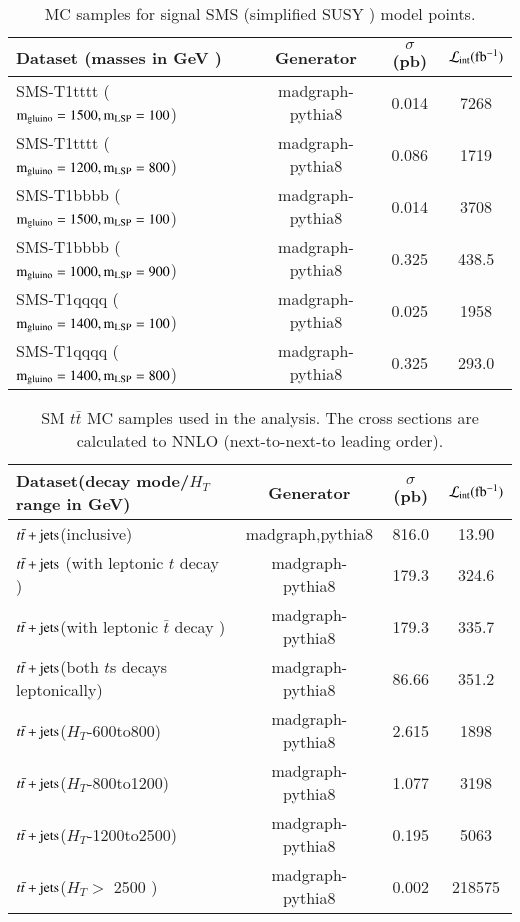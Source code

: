 \begin{table}[h]
\centering
\caption{MC  samples for signal SMS (simplified SUSY ) model points.}
\label{tab:signalMC}
{\footnotesize
\begin{tabular}{lccc}
\hline \hline
Dataset (masses in GeV ) & Generator & $\sigma$ (pb) & ${\cal L}_{\rm int}(\rm fb^{-1})$ \\
\hline
SMS-T1tttt ($\rm m_{gluino}=1500, m_{LSP}=100$) & madgraph-pythia8 & 0.014 & 7268\\
SMS-T1tttt ($\rm m_{gluino}=1200, m_{LSP}=800$) & madgraph-pythia8 & 0.086 & 1719\\
SMS-T1bbbb ($\rm m_{gluino}=1500, m_{LSP}=100$) & madgraph-pythia8 & 0.014 & 3708\\
SMS-T1bbbb ($\rm m_{gluino}=1000, m_{LSP}=900$) & madgraph-pythia8 & 0.325 & 438.5\\
SMS-T1qqqq ($\rm m_{gluino}=1400, m_{LSP}=100$) & madgraph-pythia8 & 0.025 & 1958\\
SMS-T1qqqq ($\rm m_{gluino}=1400, m_{LSP}=800$) & madgraph-pythia8 & 0.325 & 293.0\\
\hline \hline
\end{tabular}
}
\end{table}




\begin{table}[h]
\centering
\caption{SM $t\bar{t}$ MC samples used in the analysis. The cross
  sections are calculated to NNLO (next-to-next-to leading order). }
\label{tab:ttbarMCsamples}
{\footnotesize
\begin{tabular}{lccc}
\hline \hline
Dataset(decay mode/$H_{T}$ range in GeV) & Generator & $\sigma$ (pb) & ${\cal L}_{\rm int}(\rm fb^{-1})$ \\
\hline
$t\bar{t} +{\rm jets}$(inclusive)  & madgraph,pythia8 & 816.0 & 13.90\\
$t\bar{t} +{\rm jets}$ (with leptonic $t$ decay  ) & madgraph-pythia8 & 179.3 & 324.6\\
$t\bar{t} +{\rm jets}$(with leptonic $\bar{t}$ decay ) & madgraph-pythia8 & 179.3 & 335.7\\
$t\bar{t} +{\rm jets}$(both $t$s decays leptonically) & madgraph-pythia8 & 86.66 & 351.2\\
$t\bar{t} +{\rm jets}$($H_{T}$-600to800) & madgraph-pythia8 & 2.615 & 1898\\
$t\bar{t} +{\rm jets}$($H_{T}$-800to1200) & madgraph-pythia8 & 1.077 & 3198\\
$t\bar{t} +{\rm jets}$($H_{T}$-1200to2500) & madgraph-pythia8 & 0.195 & 5063\\
$t\bar{t} +{\rm jets}$($H_{T} > $ 2500 ) & madgraph-pythia8 & 0.002 & 218575\\
\hline \hline
\end{tabular}
}
\end{table}

